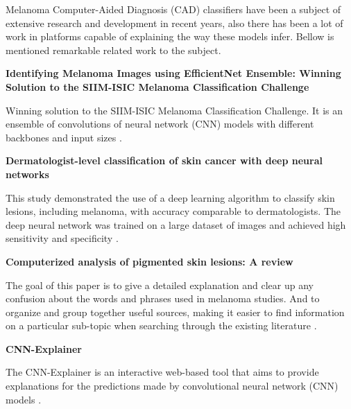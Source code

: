 Melanoma Computer-Aided Diagnosis (CAD) classifiers have been a subject of extensive research and development in recent years,
also there has been a lot of work in platforms capable of explaining the way
these models infer. Bellow is mentioned remarkable related work to the subject.
\newline

\vspace{0.5cm}
\textbf{Identifying Melanoma Images using EfficientNet Ensemble: Winning Solution to the SIIM-ISIC Melanoma Classification Challenge} \newline

Winning solution to the SIIM-ISIC Melanoma Classification Challenge. It is an
ensemble of convolutions of neural network (CNN) models with different
backbones and input sizes \cite{WinningISIC}.  \newline

\vspace{0.5cm} \textbf{Dermatologist-level classification of skin cancer with
deep neural networks} \newline

This study demonstrated the use of a deep learning algorithm to classify skin
lesions, including melanoma, with accuracy comparable to dermatologists. The
deep neural network was trained on a large dataset of images and achieved high
sensitivity and specificity \cite{SkinCancerDeepNN}. \newline

\vspace{0.5cm} \textbf{Computerized analysis of pigmented skin lesions: A
review}  \newline

The goal of this paper is to give a detailed explanation and clear up any
confusion about the words and phrases used in melanoma studies. And to organize
and group together useful sources, making it easier to find information on a
particular sub-topic when searching through the existing literature
\cite{MelanomaTopicsReview}. \newline

\newpage

\vspace{0.5cm}
\textbf{CNN-Explainer} \newline

The CNN-Explainer is an interactive web-based tool that aims to provide
explanations for the predictions made by convolutional neural network (CNN)
models \cite{CNNExplainer}.

